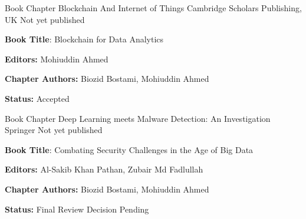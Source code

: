 \begin{cventries}
\cventry
{Book Chapter} %
{Blockchain And Internet of Things} %
{ Cambridge Scholars Publishing, UK} %
{Not yet published} %
{	\begin{cvitems} %
		\item {\textbf{Book Title}: Blockchain for Data Analytics }
		\item {\textbf{Editors:} Mohiuddin Ahmed }
		\item {\textbf{Chapter Authors:} Biozid Bostami, Mohiuddin Ahmed }
		\item {\textbf{Status:} Accepted }
	\end{cvitems}
}
\cventry
{Book Chapter} %
{Deep Learning meets Malware Detection: An Investigation} %
{ Springer} %
{Not yet published} %
{	\begin{cvitems} %
		\item {\textbf{Book Title}: Combating Security Challenges in the Age of Big Data }
		\item {\textbf{Editors:} Al-Sakib Khan Pathan, Zubair Md Fadlullah }
		\item {\textbf{Chapter Authors:} Biozid Bostami, Mohiuddin Ahmed }
		\item {\textbf{Status:} Final Review Decision Pending }
	\end{cvitems}
}

 
\end{cventries}
